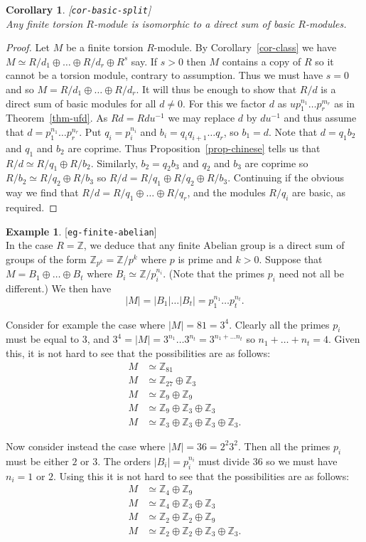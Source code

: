 \documentclass{amsart}
\newcommand{\lbl}[1]{\label{#1}\textup{[\texttt{#1}]}\ \\}
\newcommand{\lbl}{\label}
\newcommand{\Z}         {{\mathbb{Z}}}
\newcommand{\op}        {\oplus}
\renewcommand{\:}{\colon}
\newtheorem{corollary}[theorem]{Corollary}
\theoremstyle{definition}
\newtheorem{example}[theorem]{Example}
\begin{document}
\begin{corollary}\lbl{cor-basic-split}
 Any finite torsion $R$-module is isomorphic to a direct sum of basic
 $R$-modules. 
\end{corollary}
\begin{proof}
 Let $M$ be a finite torsion $R$-module.  By Corollary~\ref{cor-class}
 we have $M\simeq R/d_1\op\ldots\op R/d_r\op R^s$ say.  If $s>0$ then
 $M$ contains a copy of $R$ so it cannot be a torsion module, contrary
 to assumption.  Thus we must have $s=0$ and so
 $M=R/d_1\op\ldots\op R/d_r$.  It will thus be enough to show that
 $R/d$ is a direct sum of basic modules for all $d\neq 0$.  For this
 we factor $d$ as $up_1^{n_1}\ldots p_r^{m_r}$ as in
 Theorem~\ref{thm-ufd}.  As $Rd=Rdu^{-1}$ we may replace $d$ by
 $du^{-1}$ and thus assume that $d=p_1^{n_1}\ldots p_r^{n_r}$.  Put
 $q_i=p_i^{n_i}$ and $b_i=q_iq_{i+1}\ldots q_r$, so $b_1=d$.  Note
 that $d=q_1b_2$ and $q_1$ and $b_2$ are coprime.  Thus
 Proposition~\ref{prop-chinese} tells us that
 $R/d\simeq R/q_1\op R/b_2$.  Similarly, $b_2=q_2b_3$ and $q_2$
 and $b_3$ are coprime so $R/b_2\simeq R/q_2\op R/b_3$ so
 $R/d=R/q_1\op R/q_2\op R/b_3$.  Continuing if the obvious way we find
 that $R/d=R/q_1\op\ldots\op R/q_r$, and the modules $R/q_i$ are
 basic, as required.
\end{proof}
\begin{example}\lbl{eg-finite-abelian}
 In the case $R=\Z$, we deduce that any finite Abelian group is a
 direct sum of groups of the form $\Z_{p^k}=\Z/p^k$ where $p$ is prime
 and $k>0$.  Suppose that $M=B_1\op\ldots\op B_t$ where
 $B_i\simeq\Z/p_i^{n_i}$.  (Note that the primes $p_i$ need not all be
 different.)  We then have
 \[ |M|=|B_1|\ldots|B_t|=p_1^{n_1}\ldots p_t^{n_t}. \]

 Consider for example the case where $|M|=81=3^4$.  Clearly all the
 primes $p_i$ must be equal to $3$, and
 $3^4=|M|=3^{n_1}\ldots 3^{n_t}=3^{n_1+\ldots n_t}$ so
 $n_1+\ldots+n_t=4$.  Given this, it is not hard to see that the
 possibilities are as follows:
 \begin{align*}
  M &\simeq \Z_{81} \\
  M &\simeq \Z_{27}\op \Z_3 \\
  M &\simeq \Z_9\op\Z_9 \\
  M &\simeq \Z_9\op\Z_3\op\Z_3 \\
  M &\simeq \Z_3\op\Z_3\op\Z_3\op\Z_3.
 \end{align*}

 Now consider instead the case where $|M|=36=2^2 3^2$.  Then all the
 primes $p_i$ must be either $2$ or $3$.  The orders $|B_i|=p_i^{n_i}$
 must divide $36$ so we must have $n_i=1$ or $2$.  Using this it is
 not hard to see that the possibilities are as follows:
 \begin{align*}
  M &\simeq \Z_4\op\Z_9 \\
  M &\simeq \Z_4\op\Z_3\op\Z_3 \\
  M &\simeq \Z_2\op\Z_2\op\Z_9 \\
  M &\simeq \Z_2\op\Z_2\op\Z_3\op\Z_3.
 \end{align*}
\end{example}
\end{document}
